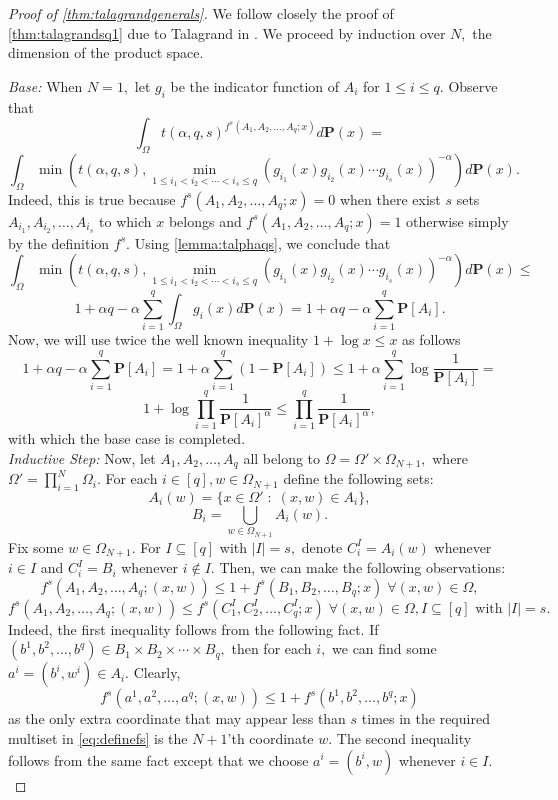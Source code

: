 \documentclass[11pt]{article}%
\numberwithin{theorem}{subsection}
\newcommand{\prob}{\mathbf{P}}
\begin{document}
\begin{proof}[Proof of \cref{thm:talagrandgenerals}] We follow closely the proof of \cref{thm:talagrandsq1} due to Talagrand in \cite{Talagrand96}. We proceed by induction over $N,$ the dimension of the product space.

\noindent
\textit{Base:}
When $N = 1,$ let $g_i$ be the indicator function of $A_i$ for $1\le i \le q.$ Observe that 
$$
\int_{\Omega}
t(\alpha, q, s)^{f^s(A_1, A_2, \ldots, A_q; x)}d\prob(x) = 
$$
$$
\int_{\Omega}
\min \left(
t(\alpha, q, s),
\min_{1\le i_1<i_2<\cdots <i_s\le q}
(g_{i_1}(x)g_{i_2}(x)\cdots g_{i_s}(x))^{-\alpha}
\right)
d\prob(x).
$$
Indeed, this is true because $f^s(A_1, A_2, \ldots, A_q; x) = 0$ when there exist $s$ sets $A_{i_1}, A_{i_2}, \ldots, A_{i_s}$ to which $x$ belongs and $f^s(A_1, A_2, \ldots, A_q; x) = 1$ otherwise simply by the definition $f^s.$ Using \cref{lemma:talphaqs},
we conclude that 
$$
\int_{\Omega}
\min \left(
t(\alpha, q, s),
\min_{1\le i_1<i_2<\cdots <i_s\le q}
(g_{i_1}(x)g_{i_2}(x)\cdots g_{i_s}(x))^{-\alpha}
\right)
d\prob(x)\le 
$$
$$
1 + \alpha q - \alpha \sum_{i=1}^q\int_{\Omega} g_i(x)d\prob(x) = 
1 + \alpha q - \alpha\sum_{i=1}^q\prob[A_i].
$$
Now, we will use twice the well known inequality $1 + \log x \le x$ as follows
$$
1 + \alpha q - \alpha\sum_{i=1}^q\prob[A_i] = 
1 + \alpha \sum_{i=1}^q (1 - \prob[A_i]) \le 
1 + \alpha \sum_{i = 1}^q \log \frac{1}{\prob[A_i]} = 
$$
$$
1 + \log \prod_{i=1}^q \frac{1}{\prob[A_i]^\alpha} \le
\prod_{i=1}^q \frac{1}{\prob[A_i]^\alpha}, 
$$
with which the base case is completed.\\

\noindent
\textit{Inductive Step:} Now, let $A_1, A_2, \ldots, A_q$ all belong to $\Omega = \Omega'\times \Omega_{N+1},$ where $\Omega' = \prod_{i=1}^N\Omega_i.$ For each $i\in [q],w\in \Omega_{N+1}$ define the following sets:
$$
A_i(w) = \{x\in \Omega'\;  : \; (x,w) \in A_i \},
$$
$$
B_i = \bigcup_{w\in \Omega_{N+1}}A_i(w).
$$
Fix some $w\in \Omega_{N+1}.$ For $I\subseteq [q]$ with $|I| = s,$ denote 
$C^I_i = A_i(w)$ whenever $i \in I$ and $C^I_i = B_i$ whenever $i \not \in I.$ Then, we can make the following observations:
$$
f^s(A_1, A_2, \ldots, A_q; (x,w))\le 
1 + f^s(B_1, B_2, \ldots, B_q; x)\; \forall (x,w)\in \Omega,
$$
$$
f^s(A_1, A_2, \ldots, A_q; (x,w))\le 
 f^s(C^I_1, C^I_2, \ldots, C^I_q; x)\; \forall (x,w)\in \Omega, I\subseteq [q] \text{ with }|I| = s.
$$
Indeed, the first inequality follows from the following fact. If $(b^1, b^2, \ldots, b^q)\in B_1\times B_2\times\cdots \times B_q,$ then for each $i, $ we can find some $a^i = (b^i, w^i)\in A_i.$ Clearly, 
$$
f^s(a^1, a^2, \ldots, a^q; (x,w))\le 
1 + f^s(b^1, b^2, \ldots, b^q; x)
$$
as the only extra coordinate that may appear less than $s$ times in the required multiset in \cref{eq:definefs} is the $N+1$'th coordinate $w.$ The second inequality follows from the same fact except that we choose $a^i = (b^i,w)$ whenever $i\in I.$\\


\end{proof}
\end{document}
